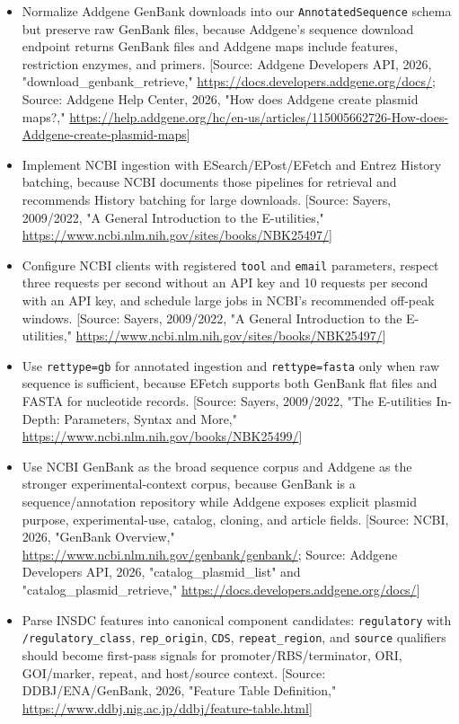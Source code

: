 \documentclass[11pt]{report}
\begin{document}
\begin{itemize}
\item Normalize Addgene GenBank downloads into our \texttt{AnnotatedSequence} schema but preserve raw GenBank files, because Addgene's sequence download endpoint returns GenBank files and Addgene maps include features, restriction enzymes, and primers. [Source: Addgene Developers API, 2026, "download\_genbank\_retrieve," \url{https://docs.developers.addgene.org/docs/}; Source: Addgene Help Center, 2026, "How does Addgene create plasmid maps?," \url{https://help.addgene.org/hc/en-us/articles/115005662726-How-does-Addgene-create-plasmid-maps}]
\item Implement NCBI ingestion with ESearch/EPost/EFetch and Entrez History batching, because NCBI documents those pipelines for retrieval and recommends History batching for large downloads. [Source: Sayers, 2009/2022, "A General Introduction to the E-utilities," \url{https://www.ncbi.nlm.nih.gov/sites/books/NBK25497/}]
\item Configure NCBI clients with registered \texttt{tool} and \texttt{email} parameters, respect three requests per second without an API key and 10 requests per second with an API key, and schedule large jobs in NCBI's recommended off-peak windows. [Source: Sayers, 2009/2022, "A General Introduction to the E-utilities," \url{https://www.ncbi.nlm.nih.gov/sites/books/NBK25497/}]
\item Use \texttt{rettype=gb} for annotated ingestion and \texttt{rettype=fasta} only when raw sequence is sufficient, because EFetch supports both GenBank flat files and FASTA for nucleotide records. [Source: Sayers, 2009/2022, "The E-utilities In-Depth: Parameters, Syntax and More," \url{https://www.ncbi.nlm.nih.gov/books/NBK25499/}]
\item Use NCBI GenBank as the broad sequence corpus and Addgene as the stronger experimental-context corpus, because GenBank is a sequence/annotation repository while Addgene exposes explicit plasmid purpose, experimental-use, catalog, cloning, and article fields. [Source: NCBI, 2026, "GenBank Overview," \url{https://www.ncbi.nlm.nih.gov/genbank/genbank/}; Source: Addgene Developers API, 2026, "catalog\_plasmid\_list" and "catalog\_plasmid\_retrieve," \url{https://docs.developers.addgene.org/docs/}]
\item Parse INSDC features into canonical component candidates: \texttt{regulatory} with \texttt{/regulatory\_class}, \texttt{rep\_origin}, \texttt{CDS}, \texttt{repeat\_region}, and \texttt{source} qualifiers should become first-pass signals for promoter/RBS/terminator, ORI, GOI/marker, repeat, and host/source context. [Source: DDBJ/ENA/GenBank, 2026, "Feature Table Definition," \url{https://www.ddbj.nig.ac.jp/ddbj/feature-table.html}]

\end{itemize}
\end{document}
